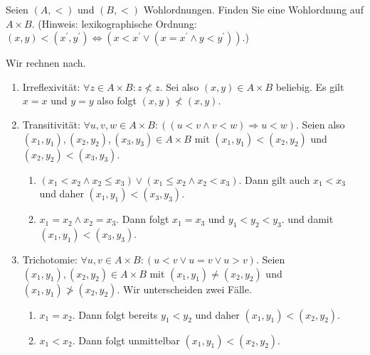 
\begin{exercise}[239]

\phantom{}
	Seien $(A,<)$ und $(B,<)$ Wohlordnungen. Finden Sie eine Wohlordnung auf $A \times B$. (Hinweis: lexikographische Ordnung: $(x,y) < (x^\prime, y^\prime) \Leftrightarrow (x < x^\prime \lor (x = x^\prime \land y < y^\prime))$.)

\end{exercise}


\begin{solution}

\phantom{}
	Wir rechnen nach.
	\begin{enumerate}
		\item Irreflexivität: $\forall z \in A \times B: z \nless z$. Sei also $(x,y) \in A \times B$ beliebig. Es gilt $x = x$ und $y = y$ also folgt $(x,y) \nless (x,y)$. 
		
		\item Transitivität: $\forall u,v,w \in A \times B: ((u < v \land v < w) \Rightarrow u < w)$. Seien also $(x_1, y_1), (x_2, y_2), (x_3, y_3) \in A \times B$ mit $(x_1, y_1) < (x_2, y_2)$ und $(x_2, y_2) < (x_3, y_3)$. 
		\begin{enumerate}[label = Fall \arabic*:]
			\item $(x_1 < x_2 \land x_2 \leq x_3) \lor (x_1 \leq x_2 \land x_2 < x_3)$. Dann gilt auch $x_1 < x_3$ und daher $(x_1, y_1) < (x_3, y_3)$.
			
			\item $x_1 = x_2 \land x_2 = x_3$. Dann folgt $x_1 = x_3$ und $y_1 < y_2 < y_3$. und damit $(x_1, y_1) < (x_3,y_3)$.  
		\end{enumerate} 
	
		\item Trichotomie: $\forall u,v \in A \times B: (u < v \lor u = v \lor u > v)$. Seien $(x_1, y_1), (x_2,y_2) \in A \times B$ mit $(x_1, y_1) \neq (x_2, y_2)$ und $(x_1, y_1) \ngtr (x_2, y_2)$. Wir unterscheiden zwei Fälle.
		\begin{enumerate}[label = Fall \arabic*:]
			\item $x_1 = x_2$. Dann folgt bereits $y_1 < y_2$ und daher $(x_1, y_1) < (x_2, y_2)$. 
			\item $x_1 < x_2$. Dann folgt unmittelbar $(x_1, y_1) < (x_2, y_2)$.  
		\end{enumerate}
	

\end{enumerate}
\end{solution}
